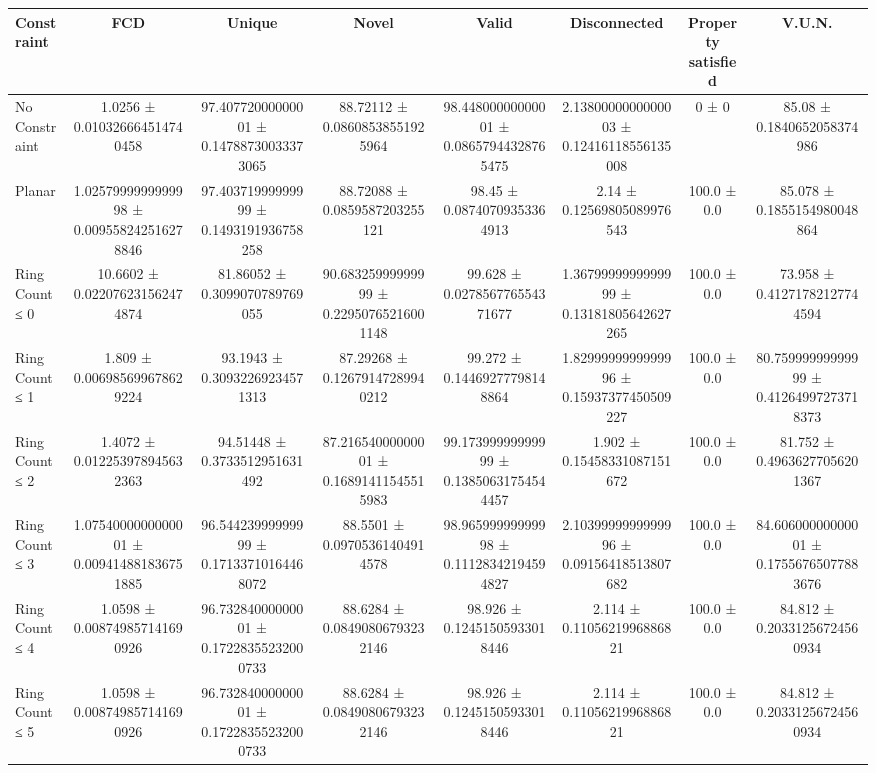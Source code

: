 \begin{table}[H]
    \centering
    \begin{tabular}{l c c c c c c c}
        \toprule
        \textbf{Constraint} & \textbf{FCD} & \textbf{Unique} & \textbf{Novel} & \textbf{Valid} & \textbf{Disconnected} & \textbf{Property satisfied} & \textbf{V.U.N.} \\
        \midrule
        No Constraint & 1.0256 ± 0.010326664514740458 & 97.40772000000001 ± 0.14788730033373065 & 88.72112 ± 0.08608538551925964 & 98.44800000000001 ± 0.08657944328765475 & 2.1380000000000003 ± 0.12416118556135008 & 0 ± 0 & 85.08 ± 0.1840652058374986 \\
        Planar & 1.0257999999999998 ± 0.009558242516278846 & 97.40371999999999 ± 0.1493191936758258 & 88.72088 ± 0.0859587203255121 & 98.45 ± 0.08740709353364913 & 2.14 ± 0.12569805089976543 & 100.0 ± 0.0 & 85.078 ± 0.1855154980048864 \\
        Ring Count ≤ 0 & 10.6602 ± 0.022076231562474874 & 81.86052 ± 0.3099070789769055 & 90.68325999999999 ± 0.22950765216001148 & 99.628 ± 0.027856776554371677 & 1.3679999999999999 ± 0.13181805642627265 & 100.0 ± 0.0 & 73.958 ± 0.41271782127744594 \\
        Ring Count ≤ 1 & 1.809 ± 0.006985699678629224 & 93.1943 ± 0.30932269234571313 & 87.29268 ± 0.12679147289940212 & 99.272 ± 0.14469277798148864 & 1.8299999999999996 ± 0.15937377450509227 & 100.0 ± 0.0 & 80.75999999999999 ± 0.41264997273718373 \\
        Ring Count ≤ 2 & 1.4072 ± 0.012253978945632363 & 94.51448 ± 0.3733512951631492 & 87.21654000000001 ± 0.16891411545515983 & 99.17399999999999 ± 0.13850631754544457 & 1.902 ± 0.15458331087151672 & 100.0 ± 0.0 & 81.752 ± 0.49636277056201367 \\
        Ring Count ≤ 3 & 1.0754000000000001 ± 0.009414881836751885 & 96.54423999999999 ± 0.17133710164468072 & 88.5501 ± 0.09705361404914578 & 98.96599999999998 ± 0.11128342194594827 & 2.1039999999999996 ± 0.09156418513807682 & 100.0 ± 0.0 & 84.60600000000001 ± 0.17556765077883676 \\
        Ring Count ≤ 4 & 1.0598 ± 0.008749857141690926 & 96.73284000000001 ± 0.17228355232000733 & 88.6284 ± 0.08490806793232146 & 98.926 ± 0.12451505933018446 & 2.114 ± 0.1105621996886821 & 100.0 ± 0.0 & 84.812 ± 0.20331256724560934 \\
        Ring Count ≤ 5 & 1.0598 ± 0.008749857141690926 & 96.73284000000001 ± 0.17228355232000733 & 88.6284 ± 0.08490806793232146 & 98.926 ± 0.12451505933018446 & 2.114 ± 0.1105621996886821 & 100.0 ± 0.0 & 84.812 ± 0.20331256724560934 \\

\end{tabular}
\end{table}
